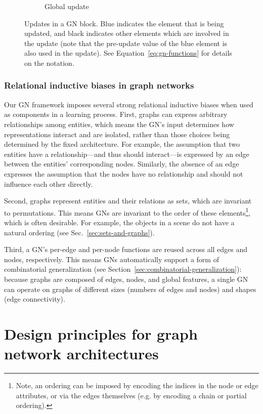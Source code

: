 \begin{figure}[t]
\begin{subfigure}[b]{0.30\textwidth}
    \caption{Global update}
\end{subfigure}
\hfill
\caption{Updates in a GN block. Blue indicates the element that is being updated, and black indicates other elements which are involved in the update (note that the pre-update value of the blue element is also used in the update). See Equation~\ref{eq:gn-functions} for details on the notation.
}
\label{fig:updates}
\end{figure}

\subsubsection{Relational inductive biases in graph networks}

Our GN framework imposes several strong relational inductive biases when used as components in a learning process.
First, graphs can express arbitrary relationships among entities, which means the GN's input determines how representations interact and are isolated, rather than those choices being determined by the fixed architecture. For example, the assumption that two entities have a relationship---and thus should interact---is expressed by an edge between the entities' corresponding nodes. Similarly, the absence of an edge expresses the assumption that the nodes have no relationship and should not influence each other directly. 

Second, graphs represent entities and their relations as sets, which are invariant to permutations. This means GNs are invariant to the order of these elements\footnote{Note, an ordering can be imposed by encoding the indices in the node or edge attributes, or via the edges themselves (e.g. by encoding a chain or partial ordering).}, which is often desirable.
For example, the objects in a scene do not have a natural ordering (see Sec.~\ref{sec:sets-and-graphs}).

Third, a GN's per-edge and per-node functions are reused across all edges and nodes, respectively. This means GNs automatically support a form of combinatorial generalization (see Section~\ref{sec:combinatorial-generalization}): because graphs are composed of edges, nodes, and global features, a single GN can operate on graphs of different sizes (numbers of edges and nodes) and shapes (edge connectivity).


\section{Design principles for graph network architectures}
\label{sec:design-principles}

